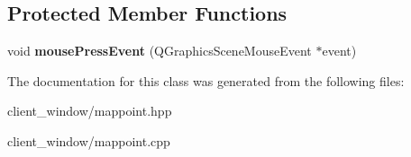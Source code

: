 \subsection*{Protected Member Functions}
\begin{DoxyCompactItemize}
\item 
void {\bfseries mouse\+Press\+Event} (Q\+Graphics\+Scene\+Mouse\+Event $\ast$event)\hypertarget{classUI_1_1mapPoint_af6d98ae85f5bb3fb10648806b5d47672}{}\label{classUI_1_1mapPoint_af6d98ae85f5bb3fb10648806b5d47672}

\end{DoxyCompactItemize}


The documentation for this class was generated from the following files\+:\begin{DoxyCompactItemize}
\item 
client\+\_\+window/mappoint.\+hpp\item 
client\+\_\+window/mappoint.\+cpp\end{DoxyCompactItemize}
